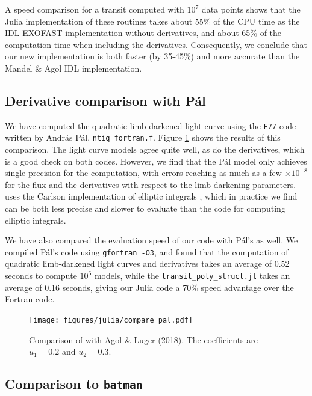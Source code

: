 \documentclass[modern]{aastex61}
\begin{document}
A speed comparison for a transit computed with $10^7$ data points shows that
the Julia implementation of these routines takes about 55\% of the CPU
time as the IDL EXOFAST implementation without derivatives, and about 65\%
of the computation time when including the derivatives.  Consequently, we
conclude that our new implementation is both faster (by 35-45\%) and more 
accurate than the Mandel \& Agol IDL implementation.

\subsection{Derivative comparison with P\'al}

We have computed the quadratic limb-darkened light curve using the \texttt{F77}
code written by Andr\'as P\'al, \texttt{ntiq\_fortran.f}.
Figure \ref{fig:Pal_comparison} shows the results of this comparison.
The light curve models agree quite well, as do the derivatives, which is
a good check on both codes.  However, we find that the P\'al model only
achieves single precision for the computation, with errors reaching as
much as a few $\times 10^{-8}$ for the flux and the derivatives with
respect to the limb darkening parameters.  \citet{Pal2008} uses the
Carlson implementation of elliptic integrals \citep{Carlson1979},
which in practice we find can be both less precise and slower to
evaluate than the \citet{Bulirsch1965a} code for computing elliptic
integrals.

We have also compared the evaluation speed of our code with P\'al's as well.
We compiled P\'al's code using \texttt{gfortran -O3}, and found that
the computation of quadratic limb-darkened light curves and
derivatives takes an average of 0.52 seconds to compute $10^6$ models,
while the \texttt{transit\_poly\_struct.jl} takes an average of 0.16 seconds,
giving our Julia code a 70\% speed advantage over the Fortran code.

\begin{figure}
    \begin{centering}
    \texttt{[image: figures/julia/compare\_pal.pdf]}
    \caption{Comparison of \citet{Pal2008} with Agol \& Luger (2018).  The
    coefficients are $u_1=0.2$ and $u_2=0.3$. 
    \label{fig:Pal_comparison}}
    \end{centering}
\end{figure}

\subsection{Comparison to \texttt{batman}}
\end{document}
